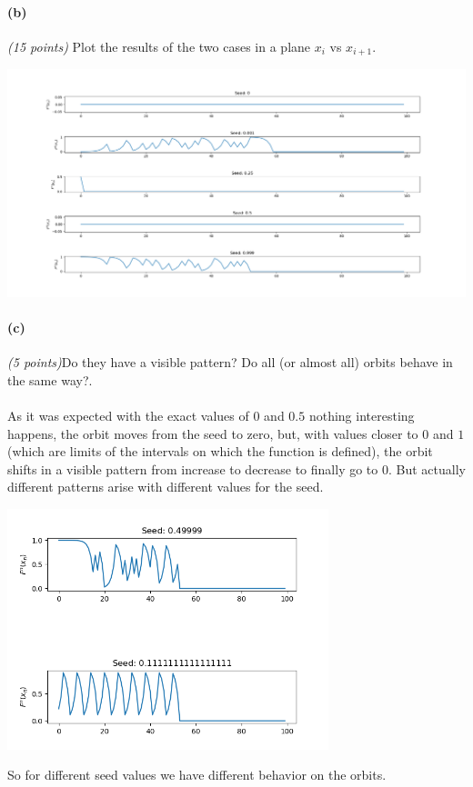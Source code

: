 \documentclass{article}
\begin{document}
\paragraph{(b)}\textit{(15 points)} Plot the results of the two cases in a plane $x_i$ vs $x_{i+1}$.
\begin{center}
	\includegraphics[width=\textwidth]{plots}
\end{center}
\paragraph{(c)}\textit{(5 points)}Do they have a visible pattern? Do all (or almost all) orbits behave in the same way?.
\paragraph{} As it was expected with the exact values of $0$ and $0.5$ nothing interesting happens, the orbit moves from the seed to zero, but, with values closer to $0$ and $1$ (which are limits of the intervals on which the function is defined), the orbit shifts in a visible pattern from increase to decrease to finally go to $0$. But actually different patterns arise with different values for the seed.
\begin{center}
	\includegraphics[width=0.7\textwidth]{plot_2.png}
\end{center}
So for different seed values we have different behavior on the orbits.
\end{document}
